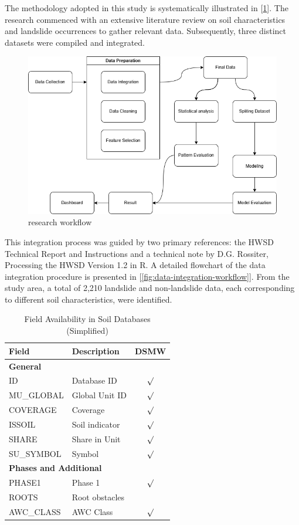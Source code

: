 The methodology adopted in this study is systematically illustrated in [\ref{fig:research-workflow}]. The research commenced with an extensive literature review on soil characteristics and landslide occurrences to gather relevant data. Subsequently, three distinct datasets were compiled and integrated.

\begin{figure}[htbp]
    \centerline{\includegraphics[width=\linewidth]{fig2.png}}
    \caption{research workflow}
    \label{fig:research-workflow}
\end{figure}
This integration process was guided by two primary references: the HWSD Technical Report and Instructions and a technical note by D.G. Rossiter, Processing the HWSD Version 1.2 in R. A detailed flowchart of the data integration procedure is presented in [\ref{fig:data-integration-workflow}]. From the study area, a total of 2,210 landslide and non-landslide data, each corresponding to different soil characteristics, were identified.

\begin{table}[H]
\caption{Field Availability in Soil Databases (Simplified)}
\centering
\begin{tabular}{|p{2cm}|p{2.8cm}|c|}
\hline
\textbf{Field} & \textbf{Description} & \textbf{DSMW} \\
\hline
\multicolumn{3}{|l|}{\textbf{General}} \\
\hline
ID & Database ID & $\surd$ \\
MU\_GLOBAL & Global Unit ID & $\surd$ \\
COVERAGE & Coverage & $\surd$ \\
ISSOIL & Soil indicator & $\surd$ \\
SHARE & Share in Unit & $\surd$ \\
SU\_SYMBOL & Symbol & $\surd$ \\
\hline
\multicolumn{3}{|l|}{\textbf{Phases and Additional}} \\
\hline
PHASE1 & Phase 1 & $\surd$ \\
ROOTS & Root obstacles &  \\
AWC\_CLASS & AWC Class & $\surd$ \\
\hline
\end{tabular}
\label{tab:soil_field_availability_small}
\end{table}

